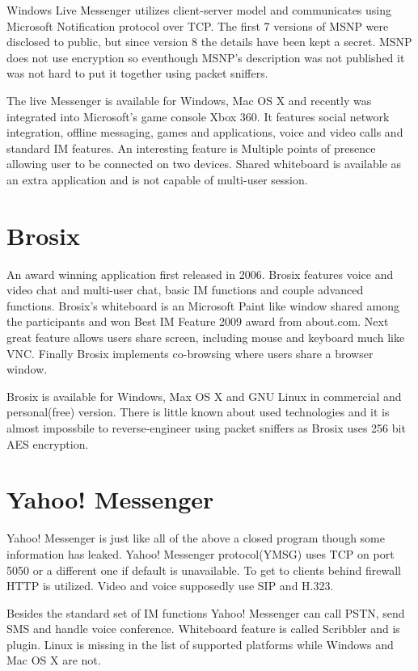 Windows Live Messenger utilizes client-server model and communicates using Microsoft Notification protocol over TCP. The first 7 versions of MSNP were disclosed to public, but since version 8 the details have been kept a secret. MSNP does not use encryption so eventhough MSNP's description was not published it was not hard to put it together using packet sniffers.

The live Messenger is available for Windows, Mac OS X and recently was integrated into Microsoft's game console Xbox 360. It features social network integration, offline messaging, games and applications, voice and video calls and standard IM features. An interesting feature is Multiple points of presence allowing user to be connected on two devices. Shared whiteboard is available as an extra application and is not capable of multi-user session.   

\section*{Brosix}
An award winning application first released in 2006. Brosix features voice and video chat and multi-user chat, basic IM functions and couple advanced functions. Brosix's whiteboard is an Microsoft Paint like window shared among the participants and won Best IM Feature 2009 award from about.com. Next great feature allows users share screen, including mouse and keyboard much like VNC. Finally Brosix implements co-browsing where users share a browser window. 

Brosix is available for Windows, Max OS X and GNU Linux in commercial and personal(free) version. There is little known about used technologies and it is almost impossbile to reverse-engineer using packet sniffers as Brosix uses 256 bit AES encryption.

\section*{Yahoo! Messenger}
Yahoo! Messenger is just like all of the above a closed program though some information has leaked\cite{wikipediaYahoo}. Yahoo! Messenger protocol(YMSG) uses TCP on port 5050 or a different one if default is unavailable. To get to clients behind firewall HTTP is utilized. Video and voice supposedly use SIP and H.323.

Besides the standard set of IM functions Yahoo! Messenger can call PSTN, send SMS and handle voice conference. Whiteboard feature is called Scribbler and is plugin. Linux is missing in the list of supported platforms while Windows and Mac OS X are not.

